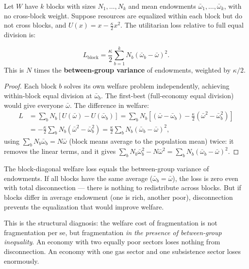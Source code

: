 \documentclass[../structural_economics_book.tex]{subfiles}
\begin{document}
\begin{proposition}\label{ch02:prop:block_loss}
\begin{sloppypar}Let $W$ have $k$ blocks with sizes $N_1, \ldots, N_k$ and mean endowments $\bar{\omega}_1, \ldots, \bar{\omega}_k$, with no cross-block weight. Suppose resources are equalized within each block but do not cross blocks, and $U(x) = x - \frac{\kappa}{2}x^2$. The utilitarian loss relative to full equal division is:\end{sloppypar}
\begin{equation}\label{ch02:eq:block_loss}
L_{\text{block}} = \frac{\kappa}{2}\sum_{b=1}^k N_b(\bar{\omega}_b - \bar{\omega})^2.
\end{equation}
This is $N$ times the \textbf{between-group variance} of endowments, weighted by $\kappa/2$.
\end{proposition}

\begin{proof}
Each block $b$ solves its own welfare problem independently, achieving within-block equal division at $\bar{\omega}_b$. The first-best (full-economy equal division) would give everyone $\bar{\omega}$. The difference in welfare:
\begin{align}
L &= \sum_b N_b \left[U(\bar{\omega}) - U(\bar{\omega}_b)\right] = \sum_b N_b \left[(\bar{\omega} - \bar{\omega}_b) - \frac{\kappa}{2}(\bar{\omega}^2 - \bar{\omega}_b^2)\right] \\
&= -\frac{\kappa}{2}\sum_b N_b(\bar{\omega}^2 - \bar{\omega}_b^2) = \frac{\kappa}{2}\sum_b N_b(\bar{\omega}_b - \bar{\omega})^2,
\end{align}
using $\sum_b N_b\bar{\omega}_b = N\bar{\omega}$ (block means average to the population mean) twice: it removes the linear terms, and it gives $\sum_b N_b\bar{\omega}_b^2 - N\bar{\omega}^2 = \sum_b N_b(\bar{\omega}_b - \bar{\omega})^2$.
\end{proof}

\begin{intuition}
The block-diagonal welfare loss equals the between-group variance of endowments. If all blocks have the same average ($\bar{\omega}_b = \bar{\omega}$), the loss is zero even with total disconnection --- there is nothing to redistribute across blocks. But if blocks differ in average endowment (one is rich, another poor), disconnection prevents the equalization that would improve welfare.

This is the structural diagnosis: the welfare cost of fragmentation is not fragmentation per se, but fragmentation \textit{in the presence of between-group inequality}. An economy with two equally poor sectors loses nothing from disconnection. An economy with one gas sector and one subsistence sector loses enormously.
\end{intuition}
\end{document}

